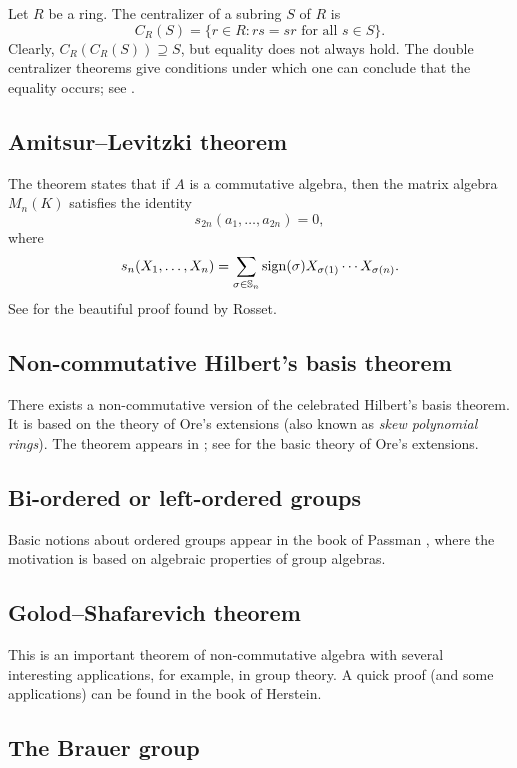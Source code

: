 Let $R$ be a ring. 
The centralizer of a subring $S$ of $R$ 
is 
\[
C_R(S)=\{r\in R: rs=sr\text{ for all $s\in S$}\}.
\]
Clearly, $C_R(C_R(S))\supseteq S$, but equality does not always hold. 
The double centralizer theorems give conditions under which one can conclude that the equality occurs; see \cite[Chapter 4]{MR3308118}. 

\subsection*{Amitsur--Levitzki theorem}

The theorem states that 
if $A$ is a commutative algebra, then 
the matrix algebra 
$M_n(K)$ satisfies the identity 
\[
s_{2n}(a_{1},\dots ,a_{2n})=0,
\]
where 
\[
s_{n}(X_1,\dots,X_n)=\sum_{\sigma\in\mathbb{S}_n}\operatorname{sign}(\sigma)X_{\sigma(1)}\cdots X_{\sigma(n)}.
\]
See \cite[Theorem 6.39]{MR3308118} for the beautiful 
proof found by Rosset. 

\subsection*{Non-commutative Hilbert's basis theorem}

There exists a non-commutative version of the celebrated
Hilbert's basis theorem. It is based on the theory of Ore's extensions (also known as \emph{skew polynomial rings}). The theorem
appears in \cite[I.8.3]{MR1321145}; see \cite[I.7]{MR1321145} 
for the basic theory of Ore's extensions. 

\subsection*{Bi-ordered or left-ordered groups}

Basic notions about ordered groups appear in the book
of Passman \cite{MR798076}, where the motivation is based on 
algebraic properties of group algebras. 

\subsection*{Golod--Shafarevich theorem}

This is an important theorem of non-commutative algebra
with several interesting applications, for example, in group theory. 
A quick proof (and some applications) can be found in the book \cite{MR1449137} of Herstein. 

\subsection*{The Brauer group}

